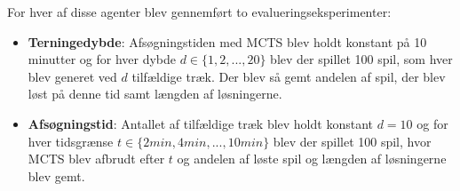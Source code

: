 \documentclass[../main.tex]{subfiles}
\begin{document}
For hver af disse agenter blev gennemført to evalueringseksperimenter:
\begin{itemize}
	\item \textbf{Terningedybde}: Afsøgningstiden med MCTS blev holdt konstant på 10 minutter og for hver dybde \(d\in \{1,2,...,20\}\) blev der spillet 100 spil, som hver blev generet ved \(d\) tilfældige træk. Der blev så gemt andelen af spil, der blev løst på denne tid samt længden af løsningerne.
	\item \textbf{Afsøgningstid}: Antallet af tilfældige træk blev holdt konstant \(d=10\) og for hver tidsgrænse \(t\in \{2\unit{min}, 4\unit{min}, ..., 10\unit{min}\}\) blev der spillet 100 spil, hvor MCTS blev afbrudt efter \(t\) og andelen af løste spil og længden af løsningerne blev gemt.
\end{itemize}
\end{document}
